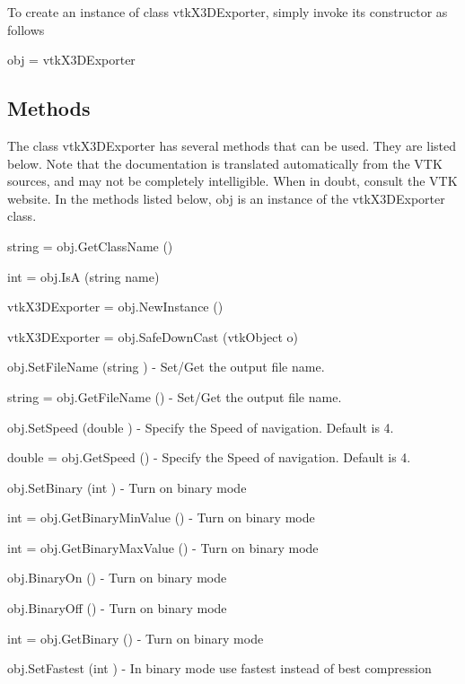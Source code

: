 To create an instance of class vtk\-X3\-D\-Exporter, simply invoke its constructor as follows \begin{DoxyVerb}  obj = vtkX3DExporter
\end{DoxyVerb}
 \hypertarget{vtkwidgets_vtkxyplotwidget_Methods}{}\subsection{Methods}\label{vtkwidgets_vtkxyplotwidget_Methods}
The class vtk\-X3\-D\-Exporter has several methods that can be used. They are listed below. Note that the documentation is translated automatically from the V\-T\-K sources, and may not be completely intelligible. When in doubt, consult the V\-T\-K website. In the methods listed below, {\ttfamily obj} is an instance of the vtk\-X3\-D\-Exporter class. 
\begin{DoxyItemize}
\item {\ttfamily string = obj.\-Get\-Class\-Name ()}  
\item {\ttfamily int = obj.\-Is\-A (string name)}  
\item {\ttfamily vtk\-X3\-D\-Exporter = obj.\-New\-Instance ()}  
\item {\ttfamily vtk\-X3\-D\-Exporter = obj.\-Safe\-Down\-Cast (vtk\-Object o)}  
\item {\ttfamily obj.\-Set\-File\-Name (string )} -\/ Set/\-Get the output file name.  
\item {\ttfamily string = obj.\-Get\-File\-Name ()} -\/ Set/\-Get the output file name.  
\item {\ttfamily obj.\-Set\-Speed (double )} -\/ Specify the Speed of navigation. Default is 4.  
\item {\ttfamily double = obj.\-Get\-Speed ()} -\/ Specify the Speed of navigation. Default is 4.  
\item {\ttfamily obj.\-Set\-Binary (int )} -\/ Turn on binary mode  
\item {\ttfamily int = obj.\-Get\-Binary\-Min\-Value ()} -\/ Turn on binary mode  
\item {\ttfamily int = obj.\-Get\-Binary\-Max\-Value ()} -\/ Turn on binary mode  
\item {\ttfamily obj.\-Binary\-On ()} -\/ Turn on binary mode  
\item {\ttfamily obj.\-Binary\-Off ()} -\/ Turn on binary mode  
\item {\ttfamily int = obj.\-Get\-Binary ()} -\/ Turn on binary mode  
\item {\ttfamily obj.\-Set\-Fastest (int )} -\/ In binary mode use fastest instead of best compression  

\end{DoxyItemize}

